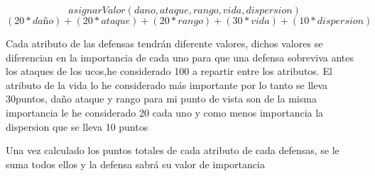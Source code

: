 
$$ asignarValor(dano,ataque,rango,vida,dispersion)$$
$$ (20*daño) + (20*ataque) + (20*rango) + (30*vida) + (10*dispersion) $$

Cada atributo de las defensas tendrán diferente valores, dichos valores se diferencian en la importancia de cada uno para que una defensa sobreviva antes los
ataques de los ucos,he considerado 100 a repartir entre los atributos. El atributo de la vida lo he considerado más importante por lo tanto se lleva 30puntos,
daño ataque y rango para mi punto de vista son de la misma importancia le he considerado 20 cada uno y como menos importancia la dispersion que se lleva 10 puntos

Una vez calculado los puntos totales de cada atributo de cada defensas, se le suma todos ellos y la defensa sabrá su valor de importancia


